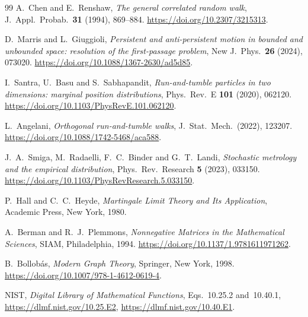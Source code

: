 \documentclass[11pt]{article}
\theoremstyle{definition}
\theoremstyle{remark}
\begin{document}
\begin{thebibliography}{99}
A.~Chen and E.~Renshaw, \emph{The general correlated random walk},
J.~Appl.~Probab.~\textbf{31} (1994), 869--884.
\url{https://doi.org/10.2307/3215313}.

D.~Marris and L.~Giuggioli, \emph{Persistent and anti-persistent motion in
bounded and unbounded space: resolution of the first-passage problem},
New J.~Phys.~\textbf{26} (2024), 073020.
\url{https://doi.org/10.1088/1367-2630/ad5d85}.

I.~Santra, U.~Basu and S.~Sabhapandit, \emph{Run-and-tumble particles in two
dimensions: marginal position distributions}, Phys.~Rev.~E \textbf{101}
(2020), 062120. \url{https://doi.org/10.1103/PhysRevE.101.062120}.

L.~Angelani, \emph{Orthogonal run-and-tumble walks}, J.~Stat.~Mech.~(2022),
123207. \url{https://doi.org/10.1088/1742-5468/aca588}.

J.~A.~Smiga, M.~Radaelli, F.~C.~Binder and G.~T.~Landi, \emph{Stochastic
metrology and the empirical distribution}, Phys.~Rev.~Research \textbf{5}
(2023), 033150. \url{https://doi.org/10.1103/PhysRevResearch.5.033150}.

P.~Hall and C.~C.~Heyde, \emph{Martingale Limit Theory and Its
Application}, Academic Press, New York, 1980.

A.~Berman and R.~J.~Plemmons, \emph{Nonnegative Matrices in the
Mathematical Sciences}, SIAM, Philadelphia, 1994.
\url{https://doi.org/10.1137/1.9781611971262}.

B.~Bollob\'as, \emph{Modern Graph Theory}, Springer, New York, 1998.
\url{https://doi.org/10.1007/978-1-4612-0619-4}.

NIST, \emph{Digital Library of Mathematical Functions}, Eqs.~10.25.2
and~10.40.1, \url{https://dlmf.nist.gov/10.25.E2},
\url{https://dlmf.nist.gov/10.40.E1}.

\end{thebibliography}
\end{document}
